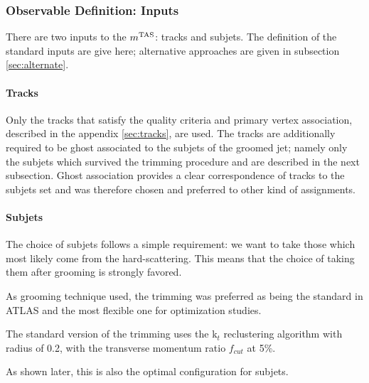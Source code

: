  



\subsubsection{Observable Definition: Inputs}
There are two inputs to the $m^\textrm{TAS}$: tracks and subjets. The definition of the standard inputs are give here; alternative approaches are given in subsection \ref{sec:alternate}.

\paragraph{Tracks}
Only the tracks that satisfy the quality criteria and primary vertex association, described in the appendix \ref{sec:tracks}, are used.
The tracks are additionally required to be ghost associated to the subjets of the groomed jet; namely only the subjets which survived the trimming procedure and are described in the next subsection.
Ghost association provides a clear correspondence of tracks to the subjets set and was therefore chosen and preferred to other kind of assignments.

\paragraph{Subjets}

The choice of subjets follows a simple requirement: we want to take those which most likely come from the hard-scattering. This means that the choice of taking them after grooming is strongly favored.

As grooming technique used, the trimming was preferred as being the standard in ATLAS and the most flexible one for optimization studies.

The standard version of the trimming uses the k$_t$ reclustering algorithm with radius of 0.2, with the transverse momentum ratio $f_{cut}$ at 5\%.

As shown later, this is also the optimal configuration for subjets.

